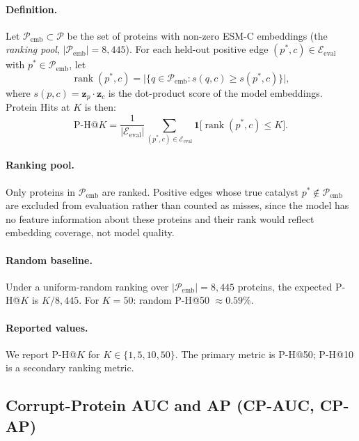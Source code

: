 \paragraph{Definition.}
Let $\mathcal{P}_\text{emb} \subset \mathcal{P}$ be the set of proteins with
non-zero ESM-C embeddings (the \emph{ranking pool}, $|\mathcal{P}_\text{emb}| = 8{,}445$).
For each held-out positive edge $(p^*, c) \in \mathcal{E}_\text{eval}$
with $p^* \in \mathcal{P}_\text{emb}$, let
\begin{equation}
  \operatorname{rank}(p^*, c)
  = \bigl|\bigl\{q \in \mathcal{P}_\text{emb}
    : s(q, c) \geq s(p^*, c)\bigr\}\bigr|,
\end{equation}
where $s(p, c) = \mathbf{z}_p \cdot \mathbf{z}_c$ is the dot-product score
of the model embeddings.
Protein Hits at $K$ is then:
\begin{equation}
  \text{P-H@}K
  = \frac{1}{|\mathcal{E}_\text{eval}|}
    \sum_{(p^*, c) \in \mathcal{E}_\text{eval}}
    \mathbf{1}\bigl[\operatorname{rank}(p^*, c) \leq K\bigr].
\end{equation}

\paragraph{Ranking pool.}
Only proteins in $\mathcal{P}_\text{emb}$ are ranked.
Positive edges whose true catalyst $p^* \notin \mathcal{P}_\text{emb}$ are
excluded from evaluation rather than counted as misses, since the model has no
feature information about these proteins and their rank would reflect embedding
coverage, not model quality.

\paragraph{Random baseline.}
Under a uniform-random ranking over $|\mathcal{P}_\text{emb}| = 8{,}445$
proteins, the expected P-H@$K$ is $K / 8{,}445$.
For $K = 50$: random P-H@50 $\approx 0.59\%$.

\paragraph{Reported values.}
We report P-H@$K$ for $K \in \{1, 5, 10, 50\}$.
The primary metric is P-H@50; P-H@10 is a secondary ranking metric.

\subsection{Corrupt-Protein AUC and AP (CP-AUC, CP-AP)}
\label{app:cpauc}

